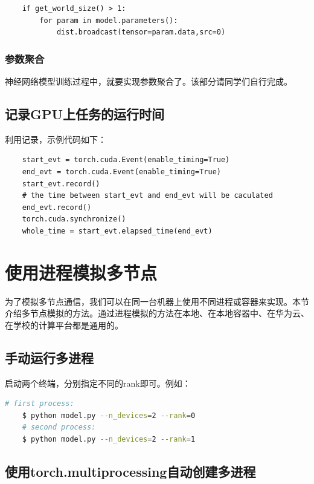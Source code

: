 \begin{lstlisting}
    if get_world_size() > 1:
        for param in model.parameters():
            dist.broadcast(tensor=param.data,src=0)
\end{lstlisting}

\subsubsection{参数聚合}

神经网络模型训练过程中，就要实现参数聚合了。该部分请同学们自行完成。

\subsection{记录GPU上任务的运行时间}

利用记录，示例代码如下：
\begin{lstlisting}
    start_evt = torch.cuda.Event(enable_timing=True)
    end_evt = torch.cuda.Event(enable_timing=True)
    start_evt.record()
    # the time between start_evt and end_evt will be caculated
    end_evt.record()
    torch.cuda.synchronize()
    whole_time = start_evt.elapsed_time(end_evt)
\end{lstlisting}

\section{使用进程模拟多节点}

为了模拟多节点通信，我们可以在同一台机器上使用不同进程或容器来实现。本节介绍多节点模拟的方法。通过进程模拟的方法在本地、在本地容器中、在华为云、在学校的计算平台都是通用的。

\subsection{手动运行多进程}
启动两个终端，分别指定不同的rank即可。例如：
\begin{lstlisting}[language=bash]
    # first process:
    $ python model.py --n_devices=2 --rank=0
    # second process:
    $ python model.py --n_devices=2 --rank=1
\end{lstlisting}

\subsection{使用torch.multiprocessing自动创建多进程}

